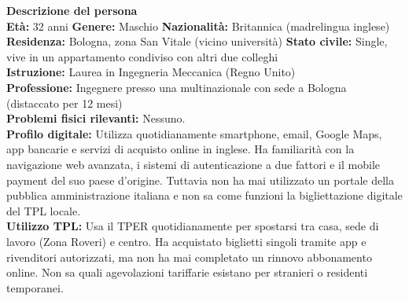 \documentclass[11pt,a4paper]{article}
\begin{document}
\begin{tcolorbox}[colback=backgroundColor,colframe=borderColor,arc=2mm]
    \textbf{Descrizione del persona} \\[4pt]
    {\small
    \textbf{Et\`a:} 32 anni \hfill
    \textbf{Genere:} Maschio \hfill
    \textbf{Nazionalit\`a:} Britannica (madrelingua inglese) \\[2pt]
    \textbf{Residenza:} Bologna, zona San Vitale (vicino universit\`a) \hfill
    \textbf{Stato civile:} Single, vive in un appartamento condiviso con altri due colleghi \\[2pt]
    \textbf{Istruzione:} Laurea in Ingegneria Meccanica (Regno Unito) \\[2pt]
    \textbf{Professione:} Ingegnere presso una multinazionale con sede a Bologna (distaccato per 12 mesi) \\[2pt]
    \textbf{Problemi fisici rilevanti:} Nessuno. \\[2pt]
    \textbf{Profilo digitale:} Utilizza quotidianamente smartphone, email, Google Maps, app bancarie e servizi di acquisto online in inglese. Ha familiarit\`a con la navigazione web avanzata, i sistemi di autenticazione a due fattori e il mobile payment del suo paese d'origine. Tuttavia non ha mai utilizzato un portale della pubblica amministrazione italiana e non sa come funzioni la bigliettazione digitale del TPL locale. \\[2pt]
    \textbf{Utilizzo TPL:} Usa il TPER quotidianamente per spostarsi tra casa, sede di lavoro (Zona Roveri) e centro. Ha acquistato biglietti singoli tramite app e rivenditori autorizzati, ma non ha mai completato un rinnovo abbonamento online. Non sa quali agevolazioni tariffarie esistano per stranieri o residenti temporanei.
    }
\end{tcolorbox}

\newpage

\end{document}
